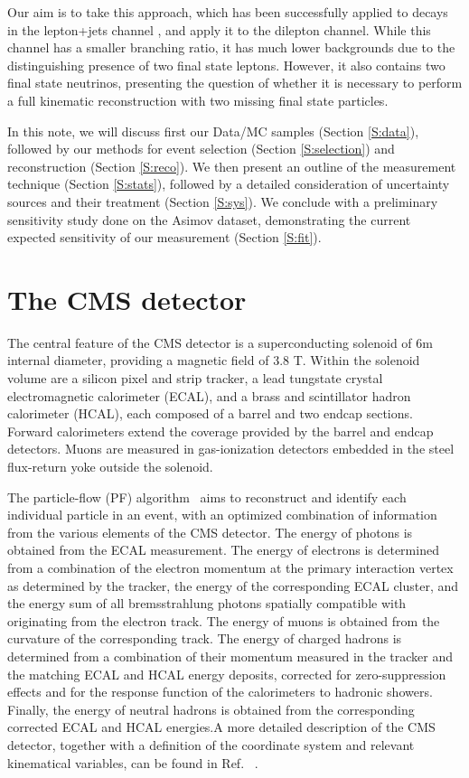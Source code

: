 Our aim is to take this approach, which has been successfully applied to \ttbar decays in the lepton+jets channel \cite{ytpaper}, and apply it to the dilepton channel. While this channel has a smaller branching ratio, it has much lower backgrounds due to the distinguishing presence of two final state leptons. However, it also contains two final state neutrinos, presenting the question of whether it is necessary to perform a full kinematic reconstruction with two missing final state particles. 

In this note, we will discuss first our Data/MC samples (Section \ref{S:data}), followed by our methods for event selection (Section \ref{S:selection}) and reconstruction (Section \ref{S:reco}). We then present an outline of the measurement technique (Section \ref{S:stats}), followed by a detailed consideration of uncertainty sources and their treatment (Section \ref{S:sys}). We conclude with a preliminary sensitivity study done on the Asimov dataset, demonstrating the current expected sensitivity of our measurement (Section \ref{S:fit}).

\clearpage


\section{The CMS detector}
\label{sec:detector}
The central feature of the CMS detector is a superconducting solenoid of 6m internal diameter,
providing a magnetic field of 3.8 T. Within the solenoid volume are a silicon pixel and strip
tracker, a lead tungstate crystal electromagnetic calorimeter (ECAL), and a brass and scintillator
hadron calorimeter (HCAL), each composed of a barrel and two endcap sections. Forward calorimeters
extend the coverage provided by the barrel and endcap detectors. Muons
are measured in gas-ionization detectors embedded in the steel flux-return yoke outside the
solenoid. 

The particle-flow (PF) algorithm~\cite{CMS-PRF-14-001} aims to reconstruct and identify each individual particle in an event, with an optimized combination of information from the various elements of the CMS detector. The energy of photons is obtained from the ECAL measurement. The energy of electrons is determined from a combination of the electron momentum at the primary interaction vertex as determined by the tracker, the energy of the corresponding ECAL cluster, and the energy sum of all bremsstrahlung photons spatially compatible with originating from the electron track. The energy of muons is obtained from the curvature of the corresponding track. The energy of charged hadrons is determined from a combination of their momentum measured in the tracker and the matching ECAL and HCAL energy deposits, corrected for zero-suppression effects and for the response function of the calorimeters to hadronic showers. Finally, the energy of neutral hadrons is obtained from the corresponding corrected ECAL and HCAL energies.A more detailed description of the CMS detector, together with a definition of the
coordinate system and relevant kinematical variables, can be found in Ref. ~\cite{Chatrchyan:2008zzk}.

